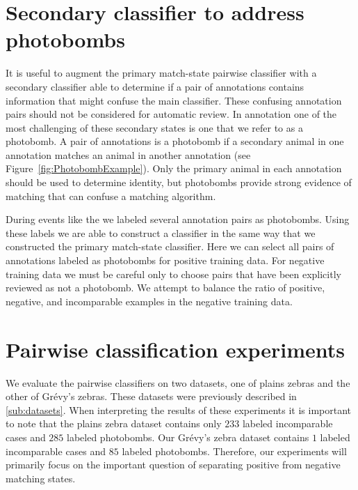 \section{Secondary classifier to address photobombs}\label{sec:learnpb}
    It is useful to augment the primary match-state pairwise classifier with a secondary classifier able to
      determine if a pair of annotations contains information that might confuse the main classifier.
    These confusing annotation pairs should not be considered for automatic review.
    In annotation one of the most challenging of these secondary states is one that we refer to as a {photobomb}.
    A pair of annotations is a photobomb if a secondary animal in one annotation matches an animal in another
      annotation (\eg see Figure~\ref{fig:PhotobombExample}).
    Only the primary animal in each annotation should be used to determine identity, but photobombs provide
      strong evidence of matching that can confuse a matching algorithm.

    \PhotobombExample{}

    During events like the \GZC{} we labeled several annotation pairs as photobombs.
    Using these labels we are able to construct a classifier in the same way that we constructed the primary
      match-state classifier.
    Here we can select all pairs of annotations labeled as photobombs for positive training data.
    For negative training data we must be careful only to choose pairs that have been explicitly reviewed as not
      a photobomb.
    We attempt to balance the ratio of positive, negative, and incomparable examples in the negative training
      data.

\section{Pairwise classification experiments}\label{sec:pairexpt}

    We evaluate the pairwise classifiers on two datasets, one of plains zebras and the other of Grévy's zebras.
    These datasets were previously described in \cref{sub:datasets}. When interpreting the results of these
    experiments it is important to note that the plains zebra dataset contains only $233$ labeled incomparable
    cases and $285$ labeled photobombs. Our Grévy's zebra dataset contains $1$ labeled incomparable cases and $85$
    labeled photobombs. Therefore, our experiments will primarily focus on the important question of separating
    positive from negative matching states.

